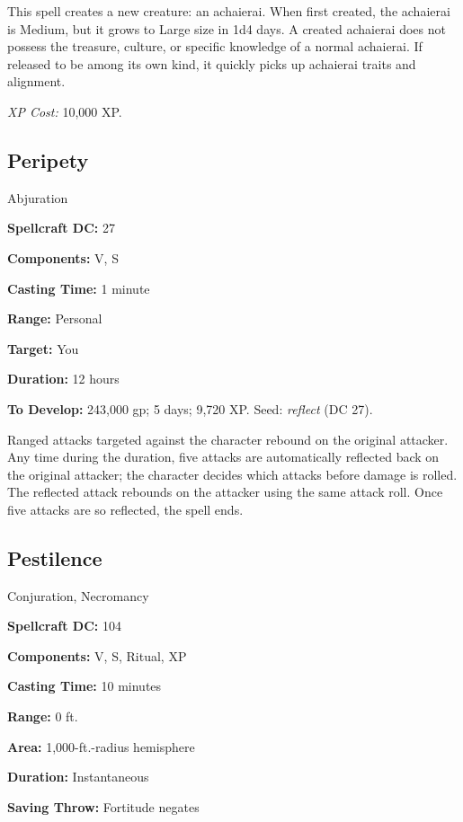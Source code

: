\documentclass{article}
\begin{document}
This spell creates a new creature: an achaierai. When first created, the achaierai 
is Medium, but it grows to Large size in 1d4 days. A created achaierai does not 
possess the treasure, culture, or specific knowledge of a normal achaierai. If 
released to be among its own kind, it quickly picks up achaierai traits and alignment. 

\textit{XP Cost: }10,000 XP. 

\vspace{12pt}
\subsection*{Peripety }

Abjuration 

\textbf{Spellcraft DC:} 27 

\textbf{Components:} V, S 

\textbf{Casting Time:} 1 minute 

\textbf{Range:} Personal 

\textbf{Target:} You 

\textbf{Duration:} 12 hours 

\textbf{To Develop:} 243,000 gp; 5 days; 9,720 XP. Seed: \textit{reflect }(DC 27). 

Ranged attacks targeted against the character rebound on the original attacker. 
Any time during the duration, five attacks are automatically reflected back on 
the original attacker; the character decides which attacks before damage is rolled. 
The reflected attack rebounds on the attacker using the same attack roll. Once 
five attacks are so reflected, the spell ends. 

\vspace{12pt}
\subsection*{Pestilence }

Conjuration, Necromancy 

\textbf{Spellcraft DC:} 104 

\textbf{Components:} V, S, Ritual, XP 

\textbf{Casting Time:} 10 minutes 

\textbf{Range:} 0 ft. 

\textbf{Area:} 1,000-ft.-radius hemisphere 

\textbf{Duration:} Instantaneous 

\textbf{Saving Throw:} Fortitude negates 
\end{document}
